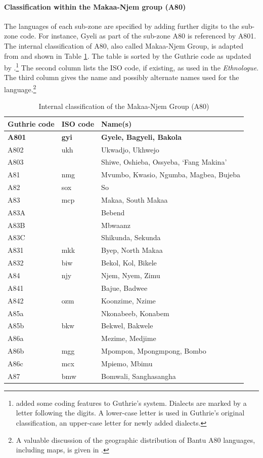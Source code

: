 \paragraph{Classification within the Makaa-Njem group (A80)} 
The languages of each sub-zone are specified by adding further digits to the sub-zone code. For instance, Gyeli as part of the sub-zone A80 is referenced by A801. The internal classification of A80, also called Makaa-Njem Group, is adapted from \citet[15]{maho2009} and shown in Table \ref{Tab:A80}.  The table is sorted by the Guthrie code as updated by \citet{maho2009}.\footnote{\citet{maho2009} added some coding features to Guthrie's system. Dialects are marked by a letter following the digits. A lower-case letter is used in Guthrie's original classification, an upper-case letter for newly added dialects.} The second column lists the ISO code, if existing, as used in the {\itshape Ethnologue}. The third column gives the name and possibly alternate names used for the language.\footnote{A valuable discussion of the geographic distribution of Bantu A80 languages, including maps, is given in \citet{cheucle2014}.}


\begin{table}
\centering
\begin{tabular}{lll}
Guthrie code & ISO code & Name(s) \\ 
 \midrule
{\bfseries A801} & {\bfseries gyi} & {\bfseries Gyele, Bagyeli, Bakola} \\
A802 & ukh &  Ukwadjo, Ukhwejo \\
A803 &      & Shiwe, Oshieba, Ossyeba, ‘Fang Makina’ \\
A81 &  nmg  & Mvumbo, Kwasio, Ngumba, Magbea, Bujeba \\
A82 & sox & So \\
A83 & mcp & Makaa, South Makaa \\
A83A &   & Bebend \\
A83B &    & Mbwaanz \\
A83C &    & Shikunda, Sekunda \\
A831 & mkk & Byep, North Makaa \\
A832 & biw & Bekol, Kol, Bikele  \\
A84 & njy  &  Njem, Nyem, Zimu \\
A841 &   &  Bajue, Badwee \\
A842 & ozm  & Koonzime, Nzime \\
A85a &      & Nkonabeeb, Konabem \\
A85b & bkw & Bekwel, Bakwele \\
A86a &  &  Mezime, Medjime \\
A86b & mgg & Mpompon, Mpongmpong, Bombo \\
A86c  & mcx & Mpiemo, Mbimu \\
A87  & bmw &  Bomwali, Sanghasangha \\
\end{tabular}
\caption{Internal classification of the Makaa-Njem Group (A80)}
\label{Tab:A80}
\end{table}


